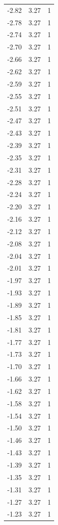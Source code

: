 \begin{longtable}{lrr}
  -2.82 & 3.27 & 1 \\
  -2.78 & 3.27 & 1 \\
  -2.74 & 3.27 & 1 \\
  -2.70 & 3.27 & 1 \\
  -2.66 & 3.27 & 1 \\
  -2.62 & 3.27 & 1 \\
  -2.59 & 3.27 & 1 \\
  -2.55 & 3.27 & 1 \\
  -2.51 & 3.27 & 1 \\
  -2.47 & 3.27 & 1 \\
  -2.43 & 3.27 & 1 \\
  -2.39 & 3.27 & 1 \\
  -2.35 & 3.27 & 1 \\
  -2.31 & 3.27 & 1 \\
  -2.28 & 3.27 & 1 \\
  -2.24 & 3.27 & 1 \\
  -2.20 & 3.27 & 1 \\
  -2.16 & 3.27 & 1 \\
  -2.12 & 3.27 & 1 \\
  -2.08 & 3.27 & 1 \\
  -2.04 & 3.27 & 1 \\
  -2.01 & 3.27 & 1 \\
  -1.97 & 3.27 & 1 \\
  -1.93 & 3.27 & 1 \\
  -1.89 & 3.27 & 1 \\
  -1.85 & 3.27 & 1 \\
  -1.81 & 3.27 & 1 \\
  -1.77 & 3.27 & 1 \\
  -1.73 & 3.27 & 1 \\
  -1.70 & 3.27 & 1 \\
  -1.66 & 3.27 & 1 \\
  -1.62 & 3.27 & 1 \\
  -1.58 & 3.27 & 1 \\
  -1.54 & 3.27 & 1 \\
  -1.50 & 3.27 & 1 \\
  -1.46 & 3.27 & 1 \\
  -1.43 & 3.27 & 1 \\
  -1.39 & 3.27 & 1 \\
  -1.35 & 3.27 & 1 \\
  -1.31 & 3.27 & 1 \\
  -1.27 & 3.27 & 1 \\
  -1.23 & 3.27 & 1 \\

\end{longtable}
